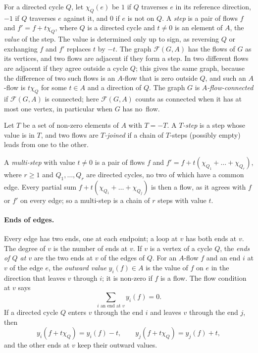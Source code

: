 \documentclass[11pt]{article}
\theoremstyle{definition}
\newcommand{\cF}{\mathcal{F}}
\begin{document}
For a directed cycle $Q$, let $\chi_Q(e)$ be $1$ if $Q$ traverses $e$ in its reference direction, $-1$ if
$Q$ traverses $e$ against it, and $0$ if $e$ is not on $Q$. A \emph{step} is a pair of flows $f$ and
$f'=f+t\chi_Q$, where $Q$ is a directed cycle and $t\ne 0$ is an element of $A$, the \emph{value} of the step. The value is determined only up to sign, as reversing $Q$ or exchanging $f$ and $f'$ replaces $t$ by $-t$. The
graph $\cF(G,A)$ has the flows of $G$ as its vertices, and two flows are adjacent if they form a step. In \cite{CLSWX,EHLMNS} two different flows are adjacent if they agree outside a cycle $Q$; this gives the same graph, because the
difference of two such flows is an $A$-flow that is zero outside $Q$, and such an $A$-flow is $t\chi_Q$ for some $t\in A$ and a direction of $Q$. The graph $G$ is \emph{$A$-flow-connected} if $\cF(G,A)$ is connected; here $\cF(G,A)$ counts as connected when it has at most one
vertex, in particular when $G$ has no~flow.

Let $T$ be a set of non-zero elements of $A$ with $T=-T$. A \emph{$T$-step} is a step whose value is in $T$, and two flows
are \emph{$T$-joined} if a chain of $T$-steps (possibly empty) leads from one to the other.

A \emph{multi-step} with value $t\ne 0$ is a pair of flows $f$ and $f'=f+t(\chi_{Q_1}+\dots+\chi_{Q_r})$, where
$r\ge 1$ and $Q_1,\dots,Q_r$ are directed cycles, no two of which have a common edge. Every partial sum
$f+t(\chi_{Q_1}+\dots+\chi_{Q_j})$ is then a flow, as it agrees with $f$ or $f'$ on every edge; so a
multi-step is a chain of $r$ steps with value $t$.

\paragraph{Ends of edges.} Every edge has two ends, one at each endpoint; a loop at $v$ has both ends at $v$. The degree of $v$ is the
number of ends at $v$. If $v$ is a vertex of a cycle $Q$, the \emph{ends of $Q$ at $v$} are the two ends at $v$ of the
edges of $Q$. For an $A$-flow $f$ and an end $i$ at $v$ of the edge $e$, the \emph{outward value}
$y_i(f)\in A$ is the value of $f$ on $e$ in the direction that leaves $v$ through $i$; it is non-zero if $f$ is a flow. The flow
condition at $v$ says
\begin{equation}\label{eq:kirchhoff}
\sum_{i\text{ an end at }v} y_i(f)=0 .
\end{equation}
If a directed cycle $Q$ enters $v$ through the end $i$ and leaves $v$ through the end $j$, then
\begin{equation}\label{eq:ends}
y_i(f+t\chi_Q)=y_i(f)-t,\qquad y_j(f+t\chi_Q)=y_j(f)+t ,
\end{equation}
and the other ends at $v$ keep their outward values.
\end{document}
